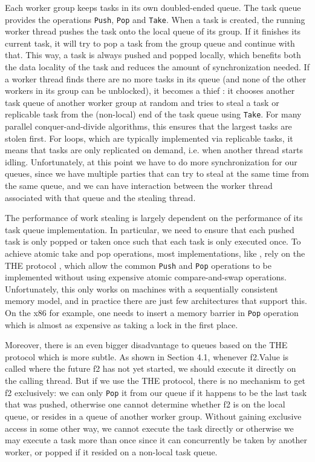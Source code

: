 Each worker group keeps tasks in its own doubled-ended queue. The task
queue provides the operations \lstinline!Push!, \lstinline!Pop! and
\lstinline!Take!. When a task is created, the running worker thread
pushes the task onto the local queue of its group. If it finishes its
current task, it will try to pop a task from the group queue and
continue with that. This way, a task is always pushed and popped
locally, which benefits both the data locality of the task and reduces
the amount of synchronization needed. If a worker thread finds there
are no more tasks in its queue (and none of the other workers in its
group can be unblocked), it becomes a thief : it chooses another task
queue of another worker group at random and tries to steal a task or
replicable task from the (non-local) end of the task queue using
\lstinline!Take!. For many parallel conquer-and-divide algorithms,
this ensures that the largest tasks are stolen first. For loops,
which are typically implemented via replicable tasks, it means that
tasks are only replicated on demand, i.e. when another thread starts
idling. Unfortunately, at this point we have to do more
synchronization for our queues, since we have multiple parties that
can try to steal at the same time from the same queue, and we can have
interaction between the worker thread associated with that queue and
the stealing thread.

The performance of work stealing is largely dependent on the
performance of its task queue implementation. In particular, we need
to ensure that each pushed task is only popped or taken once such that
each task is only executed once. To achieve atomic take and pop
operations, most implementations, like \cite{Arora2001}, rely on the
THE protocol \cite{Dijkstra1965}, which allow the common
\lstinline!Push! and \lstinline!Pop! operations to be implemented
without using expensive atomic compare-and-swap
operations. Unfortunately, this only works on machines with a
sequentially consistent memory model, and in practice there are just
few architectures that support this. On the x86 for example, one needs
to insert a memory barrier in \lstinline!Pop! operation which is
almost as expensive as taking a lock in the first place.

Moreover, there is an even bigger disadvantage to queues based on the
THE protocol which is more subtle. As shown in Section 4.1, whenever
f2.Value is called where the future f2 has not yet started, we should
execute it directly on the calling thread. But if we use the THE
protocol, there is no mechanism to get f2 exclusively: we can only
\lstinline!Pop! it from our queue if it happens to be the last task
that was pushed, otherwise one cannot determine whether f2 is on the
local queue, or resides in a queue of another worker group. Without
gaining exclusive access in some other way, we cannot execute the task
directly or otherwise we may execute a task more than once since it
can concurrently be taken by another worker, or popped if it resided
on a non-local task queue.

